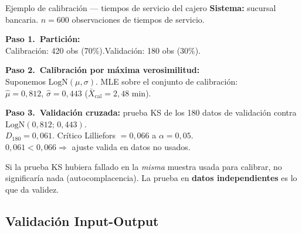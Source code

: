 \documentclass[aspectratio=1610, 10pt]{beamer}
\begin{document}
\begin{frame}{Ejemplo de calibración — tiempos de servicio del cajero}
  \footnotesize
  \textbf{Sistema:} sucursal bancaria. $n=600$ observaciones de tiempos de servicio.

  \vspace{2pt}
  \textbf{Paso 1.\ Partición:}\\
  Calibración: 420 obs (70\%).\quad Validación: 180 obs (30\%).

  \vspace{4pt}
  \textbf{Paso 2.\ Calibración por máxima verosimilitud:}\\
  Suponemos $\mathrm{LogN}(\mu,\sigma)$. MLE sobre el conjunto de calibración:\\
  $\hat\mu=0{,}812$, $\hat\sigma=0{,}443$ \quad ($\bar X_{\text{cal}}=2{,}48$ min).

  \vspace{4pt}
  \textbf{Paso 3.\ Validación cruzada:} prueba KS de los 180 datos de validación
  contra $\mathrm{LogN}(0{,}812;\,0{,}443)$.\\
  $D_{180}=0{,}061$. Crítico Lilliefors $=0{,}066$ a $\alpha=0{,}05$.\\
  \textcolor{deepgreen}{$0{,}061 < 0{,}066 \Rightarrow$ ajuste valida en datos no usados.}

  \vspace{6pt}
  \begin{alertabox}[Advertencia]
    \footnotesize
    Si la prueba KS hubiera fallado en la \emph{misma} muestra usada para calibrar,
    no significaría nada (autocomplacencia). La prueba en \textbf{datos
    independientes} es lo que da validez.
  \end{alertabox}
\end{frame}

\subsection{Validación Input-Output}
\end{document}
